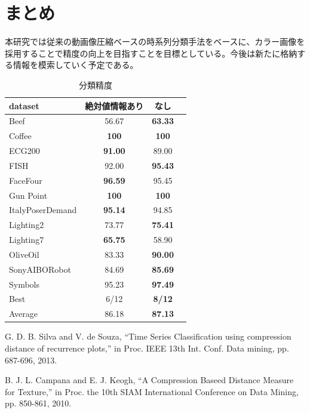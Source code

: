 \documentclass{cssotsuken}
\begin{document}
\section{まとめ}
本研究では従来の動画像圧縮ベースの時系列分類手法をベースに、カラー画像を採用することで精度の向上を目指すことを目標としている。今後は新たに格納する情報を模索していく予定である。

\begin{table}[t]
	\small
	\caption{分類精度}
	\label{ta:hikaku}
    \begin{center}
	\begin{tabular}{lccc}
		\hline
		dataset&絶対値情報あり&なし\\
		\hline
		\hline
		Beef&56.67&\bf{63.33}\\
		Coffee&\bf{100}&\bf{100}\\
		ECG200&\bf{91.00}&89.00\\
		FISH&92.00&\bf{95.43}\\
		FaceFour&\bf{96.59}&95.45\\
		Gun Point&\bf{100}&\bf{100}\\
		ItalyPoserDemand&\bf{95.14}&94.85\\
		Lighting2&73.77&\bf{75.41}\\
		Lighting7&\bfseries{65.75}&58.90\\
		OliveOil&83.33&\bfseries{90.00}\\
		SonyAIBORobot&84.69&\bfseries{85.69}\\
		Symbols&95.23&\bfseries{97.49}\\
		\hline
		Best&6/12&\bf{8}/12\\
		Average&86.18&\bfseries{87.13}\\
		\hline
	\end{tabular}
    \end{center}
\end{table}


\begin{thebibliography}{99}
G. D. B. Silva and V. de Souza, “Time Series Classification
using compression distance of recurrence plots,” in Proc.
IEEE 13th Int. Conf. Data mining, pp. 687-696, 2013.

B. J. L. Campana and E. J. Keogh, ``A Compression Baseed Distance Measure for Texture,'' in Proc.  the 10th SIAM International Conference on Data Mining, pp. 850-861, 2010.

\end{thebibliography}
\end{document}
